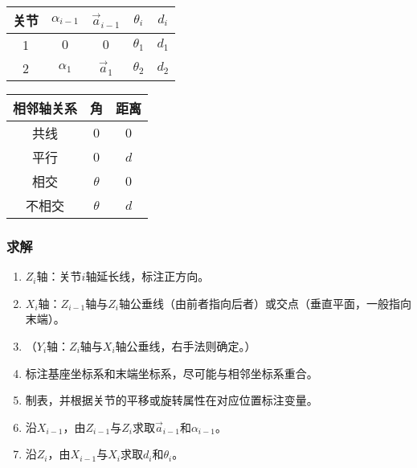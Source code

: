 \documentclass[
12pt, %
a4paper, 
oneside, %
headinclude,footinclude, %
]{scrartcl}
\begin{document}
\begin{minipage}{0.48\textwidth}
\centering
{}
\begin{tabular}{c|cccc}
\hline
关节 & $ \alpha_{i - 1} $ & $ \vec a_{i - 1} $ & $ \theta_i $ & $ d_i $ \\
\hline
1 & $ 0 $ & $ 0 $ & $ \theta_1 $ & $ d_1 $ \\
2 & $ \alpha_1 $ & $ \vec a_1 $ & $ \theta_2 $ & $ d_2 $ \\
\hline
\end{tabular}
\end{minipage}
\hfill
\begin{minipage}{0.48\textwidth}
\centering
{}
\begin{tabular}{c|cc}
\hline
相邻轴关系 & 角 & 距离 \\
\hline
共线 & $ 0 $ & $ 0 $ \\
平行 & $ 0 $ & $ d $ \\
相交 & $ \theta $ & $ 0 $ \\
不相交 & $ \theta $ & $ d $ \\
\hline
\end{tabular}
\end{minipage}
\subsubsection{求解}
\begin{enumerate}
\item $ Z_i $轴：关节$ i $轴延长线，标注正方向。
\item $ X_i $轴：$ Z_{i - 1} $轴与$ Z_i $轴公垂线（由前者指向后者）或交点（垂直平面，一般指向末端）。
\item （$ Y_i $轴：$ Z_i $轴与$ X_i $轴公垂线，右手法则确定。）
\item 标注基座坐标系和末端坐标系，尽可能与相邻坐标系重合。
\item 制表，并根据关节的平移或旋转属性在对应位置标注变量。
\item 沿$ X_{i - 1} $，由$ Z_{i - 1} $与$ Z_i $求取$ \vec a_{i - 1}  $和$ \alpha_{i - 1} $。
\item 沿$ Z_i $，由$ X_{i - 1} $与$ X_i $求取$ d_i $和$ \theta_i $。
\end{enumerate}
\end{document}
